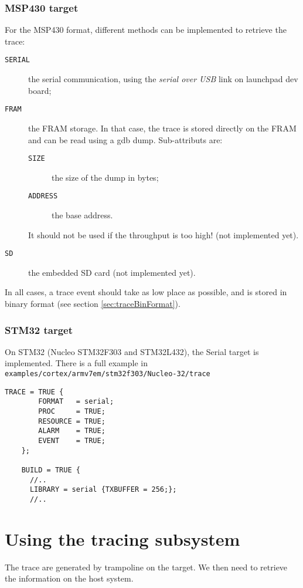 \subsubsection{MSP430 target}
For the MSP430 format, different methods can be implemented to retrieve the trace:
\begin{description}
	\item[\texttt{SERIAL}] the serial communication, using the \emph{serial over USB} link on launchpad dev board;
	\item[\texttt{FRAM}] the FRAM storage. In that case, the trace is stored directly on the FRAM and can be read using a gdb dump. Sub-attributs are:
\begin{description}
	\item[\texttt{SIZE}] the size of the dump in bytes;
	\item[\texttt{ADDRESS}] the base address.
\end{description} It should not be used if the throughput is too high!
(not implemented yet).

	\item[\texttt{SD}] the embedded SD card (not implemented yet).
\end{description}

In all cases, a trace event should take as low place as possible, and is stored in binary format (see section \ref{sec:traceBinFormat}).

\subsubsection{STM32 target}
On STM32 (Nucleo STM32F303 and STM32L432), the Serial target is implemented. There is a full example in \texttt{examples/cortex/armv7em/stm32f303/Nucleo-32/trace}

\begin{lstlisting}[language=OIL]
    TRACE = TRUE {
        FORMAT   = serial;
        PROC     = TRUE;
        RESOURCE = TRUE;
        ALARM    = TRUE;
        EVENT    = TRUE;
    };
    
    BUILD = TRUE {
	  //..
      LIBRARY = serial {TXBUFFER = 256;};
	  //..

\end{lstlisting}

\section{Using the tracing subsystem}

The trace are generated by trampoline on the target. We then need to retrieve the information on the host system. 

